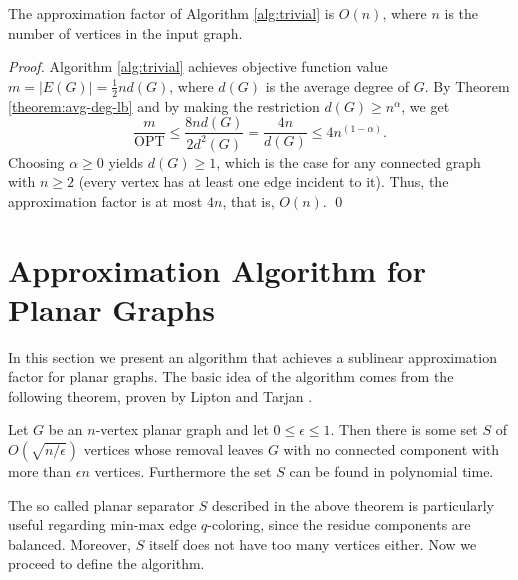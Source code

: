 \documentclass[runningheads, a4paper]{llncs}
\begin{document}
\begin{theorem}\label{theorem:factor-ub}
The approximation factor of Algorithm \ref{alg:trivial} is $O(n)$, where $n$ is the number of vertices in the input graph.
\end{theorem}
\begin{proof}
Algorithm \ref{alg:trivial} achieves objective function value $m = |E(G)| = \frac{1}{2}nd(G)$, where $d(G)$ is the average degree of $G$. By Theorem \ref{theorem:avg-deg-lb} and by making the restriction $d(G) \geq n^\alpha$, we get
\begin{displaymath}
\frac{m}{\textrm{OPT}} \leq \frac{8nd(G)}{2d^2(G)} = \frac{4n}{d(G)} \leq 4n^{(1-\alpha)}.
\end{displaymath}
Choosing $\alpha \geq 0$ yields $d(G) \geq 1$, which is the case for any connected graph with $n \geq 2$ (every vertex has at least one edge incident to it). Thus, the approximation factor is at most $4n$, that is, $O(n)$. \qed
\end{proof}

\section{Approximation Algorithm for Planar Graphs}\label{sect:separator}



In this section we present an algorithm that achieves a sublinear approximation factor for planar graphs. The basic idea of the algorithm comes from the following theorem, proven by Lipton and Tarjan \cite{Lipton1980}.

\begin{theorem}\label{theorem:separator}
Let $G$ be an $n$-vertex planar graph and let $0 \leq \epsilon \leq 1$. Then there is some set $S$ of $O(\sqrt{n / \epsilon})$ vertices whose removal leaves $G$ with no connected component with more than $\epsilon n$ vertices. Furthermore the set $S$ can be found in polynomial time.
\end{theorem}

The so called planar separator $S$ described in the above theorem is particularly useful regarding min-max edge $q$-coloring, since the residue components are balanced. Moreover, $S$ itself does not have too many vertices either. Now we proceed to define the algorithm.
\end{document}
